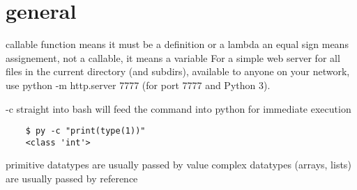 \section{general}%
\label{sec:general}

callable function means it must be a definition or a lambda
an equal sign means assignement, not a callable, it means a variable
For a simple web server for all files in the current directory (and subdirs), available to anyone on your network, use python -m http.server 7777 (for port 7777 and Python 3).

-c straight into bash will feed the command into python for immediate execution
\begin{verbatim}
	$ py -c "print(type(1))"
	<class 'int'>
\end{verbatim}

primitive datatypes are usually passed by value
complex datatypes (arrays, lists) are usually passed by reference
